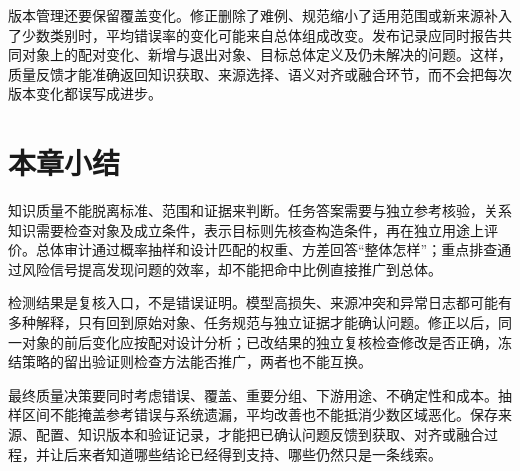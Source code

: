 版本管理还要保留覆盖变化。修正删除了难例、规范缩小了适用范围或新来源补入了少数类别时，平均错误率的变化可能来自总体组成改变。发布记录应同时报告共同对象上的配对变化、新增与退出对象、目标总体定义及仍未解决的问题。这样，质量反馈才能准确返回知识获取、来源选择、语义对齐或融合环节，而不会把每次版本变化都误写成进步。

\section{本章小结}
\label{sec:knowledge-quality-assessment-correction-summary}

知识质量不能脱离标准、范围和证据来判断。任务答案需要与独立参考核验，关系知识需要检查对象及成立条件，表示目标则先核查构造条件，再在独立用途上评价。总体审计通过概率抽样和设计匹配的权重、方差回答“整体怎样”；重点排查通过风险信号提高发现问题的效率，却不能把命中比例直接推广到总体。

检测结果是复核入口，不是错误证明。模型高损失、来源冲突和异常日志都可能有多种解释，只有回到原始对象、任务规范与独立证据才能确认问题。修正以后，同一对象的前后变化应按配对设计分析；已改结果的独立复核检查修改是否正确，冻结策略的留出验证则检查方法能否推广，两者也不能互换。

最终质量决策要同时考虑错误、覆盖、重要分组、下游用途、不确定性和成本。抽样区间不能掩盖参考错误与系统遗漏，平均改善也不能抵消少数区域恶化。保存来源、配置、知识版本和验证记录，才能把已确认问题反馈到获取、对齐或融合过程，并让后来者知道哪些结论已经得到支持、哪些仍然只是一条线索。
